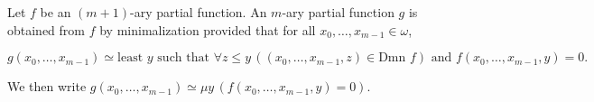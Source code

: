 Let $f$ be an $(m + 1)$-ary partial function. An $m$-ary partial function $g$ is obtained from $f$ by minimalization provided that for all $x_0, \ldots, x_{m-1} \in \omega$,

$$g(x_0, \ldots, x_{m-1}) \simeq \text{least } y \text{ such that } \forall z \leq y \, ((x_0, \ldots, x_{m-1}, z) \in \text{Dmn } f) \text{ and } f(x_0, \ldots, x_{m-1}, y) = 0.$$

We then write $g(x_0, \ldots, x_{m-1}) \simeq \mu y \, (f(x_0, \ldots, x_{m-1}, y) = 0)$.

